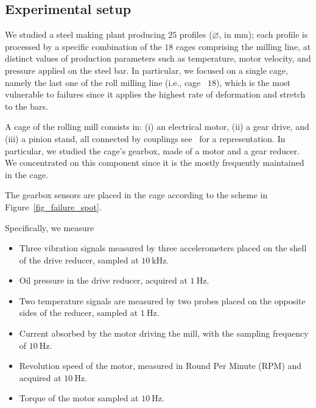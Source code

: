 \subsection{Experimental setup}\label{subsec:exp_setup}


We studied a steel making plant producing $25$ profiles ($\diameter$, in mm); each profile is processed by a specific combination of the $18$ cages comprising the milling line, at  distinct values of production parameters such as temperature, motor velocity, and pressure applied on the steel bar. In particular, we focused on a single cage, namely the last one of the roll milling line (i.e., cage ~$18$), which is the most vulnerable to failures since it applies the highest rate of deformation and stretch to the bars.

A cage of the rolling mill consists in: (i) an electrical motor, (ii) a gear drive, and (iii) a pinion stand, all connected by couplings see~\citep{sarda2021} for a representation. In particular, we studied the cage's gearbox, made of a motor and a gear reducer. We concentrated on this component since it is the mostly frequently maintained in the cage. 

 The gearbox sensors are placed in the cage according to the scheme in Figure~\ref{fig_failure_spot}. 
{Specifically, we measure
\begin{itemize}
    \item Three vibration signals measured by three accelerometers placed on the shell of the drive reducer, sampled at $10~\text{kHz}$.
    \item Oil pressure in the drive reducer, acquired at $1~\text{Hz}$.
    \item Two temperature signals are measured by two probes placed on the opposite sides of the reducer, sampled at $1~\text{Hz}$.
    \item Current absorbed by the motor driving the mill, with the sampling frequency of $10~\text{Hz}$.
    \item Revolution speed of the motor, measured in Round Per Minute (RPM) and acquired at $10~\text{Hz}$.
    \item Torque of the motor sampled at $10~\text{Hz}$.
\end{itemize}}


